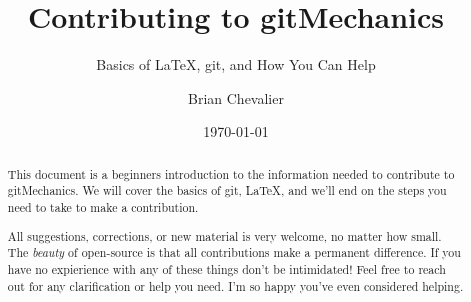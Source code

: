\documentclass[landscape, twocolumn, 12pt]{article}
\title{Contributing to gitMechanics}
\subtitle{Basics of \LaTeX{}, git, and How You Can Help}
\author{Brian Chevalier}
\date{\today}
\begin{document}
\maketitle

\renewcommand{\abstractname}{Welcome to the gitMechanics Team!}

\begin{abstract}
This document is a beginners introduction to the information needed to contribute to gitMechanics. We will cover the basics of git, \LaTeX{}, and we'll end on the steps you need to take to make a contribution.

All suggestions, corrections, or new material is very welcome, no matter how small. The \textit{beauty} of open-source is that all contributions make a permanent difference. If you have no expierience with any of these things don't be intimidated! Feel free to reach out for any clarification or help you need. I'm so happy you've even considered helping.
\end{abstract}






\begin{appendices}
	
	
\end{appendices}





%
%
\end{document}
